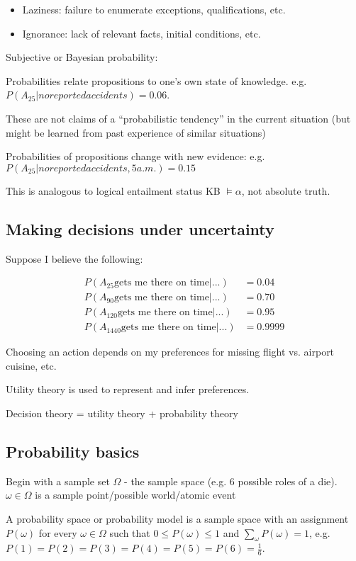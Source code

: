 \begin{itemize}
    \item Laziness: failure to enumerate exceptions, qualifications, etc.
    \item Ignorance: lack of relevant facts, initial conditions, etc.
\end{itemize}

Subjective or Bayesian probability:

Probabilities relate propositions to one's own state of knowledge. e.g.
$P(A_{25}|no reported accidents) = 0.06$.

These are not claims of a ``probabilistic tendency'' in the current situation
(but might be learned from past experience of similar situations)

Probabilities of propositions change with new evidence: e.g. $P(A_{25}|no
reported accidents, 5 a.m.) = 0.15$

This is analogous to logical entailment status KB $\models \alpha$, not
absolute truth.

\subsection{Making decisions under uncertainty}
Suppose I believe the following:

\begin{align*}
    P(A_{25} \text{gets me there on time}|...) &= 0.04\\
    P(A_{90} \text{gets me there on time}|...) &= 0.70\\
    P(A_{120} \text{gets me there on time}|...) &= 0.95\\
    P(A_{1440} \text{gets me there on time}|...) &= 0.9999
\end{align*}

Choosing an action depends on my preferences for missing flight vs. airport
cuisine, etc.

Utility theory is used to represent and infer preferences.

Decision theory = utility theory + probability theory

\subsection{Probability basics}
Begin with a sample set $\Omega$ - the sample space (e.g. 6 possible roles of a
die). $\omega \in \Omega$ is a sample point/possible world/atomic event

A probability space or probability model is a sample space with an assignment
$P(\omega)$ for every $\omega \in \Omega$ such that $0 \leq P(\omega) \leq 1$
and $\sum_{\omega} P(\omega) = 1$, e.g. $P(1) = P(2) = P(3) = P(4) = P(5) =
P(6) = \frac{1}{6}$.

